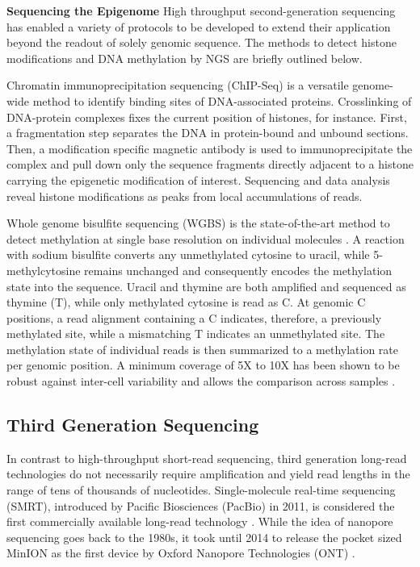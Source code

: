 \textbf{Sequencing the Epigenome}
High throughput second-generation sequencing has enabled a variety of protocols to be developed to extend their application beyond the readout of solely genomic sequence.
The methods to detect histone modifications and DNA methylation by NGS are briefly outlined below.

Chromatin immunoprecipitation sequencing (ChIP-Seq) is a versatile genome-wide method to identify binding sites of DNA-associated proteins.
Crosslinking of DNA-protein complexes fixes the current position of histones, for instance.
First, a fragmentation step separates the DNA in protein-bound and unbound sections.
Then, a modification specific magnetic antibody is used to immunoprecipitate the complex and pull down only the sequence fragments directly adjacent to a histone carrying the epigenetic modification of interest.
Sequencing and data analysis reveal histone modifications as peaks from local accumulations of reads.

Whole genome bisulfite sequencing (WGBS) is the state-of-the-art method to detect methylation at single base resolution on individual molecules \cite{Frommer1992}.
A reaction with sodium bisulfite converts any unmethylated cytosine to uracil, while 5-methylcytosine remains unchanged and consequently encodes the methylation state into the sequence. 
Uracil and thymine are both amplified and sequenced as thymine (T), while only methylated cytosine is read as C.
At genomic C positions, a read alignment containing a C indicates, therefore, a previously methylated site, while a mismatching T indicates an unmethylated site.
The methylation state of individual reads is then summarized to a methylation rate per genomic position.
A minimum coverage of 5X to 10X has been shown to be robust against inter-cell variability and allows the comparison across samples \cite{Ziller2015}.




\subsection{Third Generation Sequencing}
\label{subsec:intro:tgs}

In contrast to high-throughput short-read sequencing, third generation long-read technologies do not necessarily require amplification and yield read lengths in the range of tens of thousands of nucleotides. 
Single-molecule real-time sequencing (SMRT), introduced by Pacific Biosciences (PacBio) in 2011, is considered the first commercially available long-read technology \cite{Dijk2018}.
While the idea of nanopore sequencing goes back to the 1980s, it took until 2014 to release the pocket sized MinION as the first device by Oxford Nanopore Technologies (ONT) \cite{Deamer2016}.

